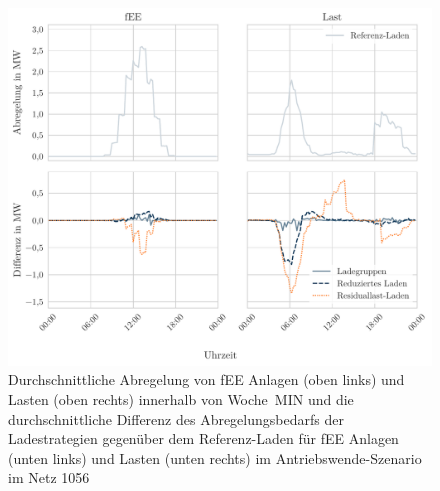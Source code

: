 \begin{figure}[H]
    \centering
    \includegraphics[width=\textwidth]{Bilder/1056_fEE_load_diff}
    \caption{Durchschnittliche Abregelung von fEE Anlagen (oben links) und Lasten (oben rechts) innerhalb von Woche~MIN und die durchschnittliche Differenz des Abregelungsbedarfs der Ladestrategien gegenüber dem Referenz-Laden für fEE Anlagen (unten links) und Lasten (unten rechts) im Antriebswende-Szenario im Netz \num{1056}}\label{fig:1056_fEE_load_diff}
\end{figure}